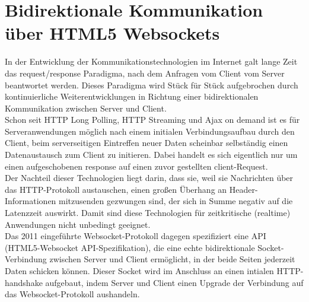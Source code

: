 \section{Bidirektionale Kommunikation über HTML5 Websockets}\label{s.Websockets}
In der Entwicklung der Kommunikationstechnologien im Internet galt lange Zeit das request/response Paradigma, nach dem Anfragen vom Client vom Server beantwortet werden. Dieses Paradigma wird Stück für Stück aufgebrochen durch kontinuierliche Weiterentwicklungen in Richtung einer bidirektionalen Kommunikation zwischen Server und Client.\\
Schon seit HTTP Long Polling, HTTP Streaming und Ajax on demand ist es für Serveranwendungen möglich nach einem initialen Verbindungsaufbau durch den Client, beim serverseitigen Eintreffen neuer Daten scheinbar selbständig einen Datenaustausch zum Client zu initieren. Dabei handelt es sich eigentlich nur um einen aufgeschobenen response auf einen zuvor gestellten client-Request.\\
Der Nachteil dieser Technologien liegt darin, dass sie, weil sie Nachrichten über das HTTP-Protokoll austauschen, einen großen Überhang an Header-Informationen mitzusenden gezwungen sind, der sich in Summe negativ auf die Latenzzeit auswirkt. Damit sind diese Technologien für zeitkritische (realtime) Anwendungen nicht unbedingt geeignet.
\\
Das 2011 eingeführte Websocket-Protokoll dagegen spezifiziert eine API (HTML5-Websocket API-Spezifikation), die eine echte bidirektionale Socket-Verbindung zwischen Server und Client ermöglicht, in der beide Seiten jederzeit Daten schicken können. Dieser Socket wird im Anschluss an einen intialen HTTP-handshake aufgebaut, indem Server und Client  einen Upgrade der Verbindung auf das Websocket-Protokoll aushandeln. 

